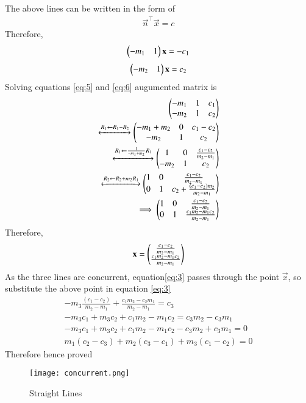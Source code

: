 \documentclass[12pt]{article}
\begin{document}
\begin{enumerate}
    
   The above lines can be written in the form of \begin{align}
        \Vec{n}^{\top}\Vec{x} = c
    \end{align}
   Therefore,
		\begin{align}
       \begin{pmatrix}-m_1&1\end{pmatrix}\mathbf{x}=-c_1
       \label{eq:5}
   \end{align} 
   \begin{align}
       \begin{pmatrix}-m_2&1\end{pmatrix}\mathbf{x}=c_2
       \label{eq:6}
   \end{align}
   Solving equations \eqref{eq:5} and \eqref{eq:6}
		augumented matrix is
 \begin{align}
    \begin{pmatrix}-m_1&1&c_1\\-m_2&1&c_2\end{pmatrix}\\
    \xleftrightarrow{R_1 \leftarrow R_1-R_2}
    \begin{pmatrix}-m_1+m_2&0&c_1-c_2\\-m_2&1&c_2\end{pmatrix}\\
    \xleftrightarrow{R_1 \leftarrow \frac{1}{-m_1+m_2} R_1}
    \begin{pmatrix}1&0&\frac{c_1-c_2}{m_2-m_1}\\-m_2&1&c_2\end{pmatrix}\\
    \xleftrightarrow{R_2 \leftarrow R_2+m_2R_1}
    \begin{pmatrix}1&0&\frac{c_1-c_2}{m_2-m_1}\\0&1&c_2+\frac{(c_1-c_2)m_2}{m_2-m_1}\end{pmatrix}\\
   \implies \begin{pmatrix}1&0&\frac{c_1-c_2}{m_2-m_1}\\0&1&\frac{c_1m_2-m_1c_2}{m_2-m_1}\end{pmatrix}
\end{align}
Therefore, \begin{align}    
\mathbf{x} = \begin{pmatrix}\frac{c_1-c_2}{m_2-m_1}\\\frac{c_1m_2-m_1c_2}{m_2-m_1}\end{pmatrix}
\end{align}
As the three lines are concurrent, equation\eqref{eq:3} passes through the point $\Vec{x}$, so substitute the above point in equation
\eqref{eq:3}
\begin{align}
    -m_3\frac{(c_1-c_2)}{m_2-m_1}+\frac{c_1m_2-c_2m_1}{m_2-m_1} = c_3\\
    -m_3c_1+m_3c_2+c_1m_2-m_1c_2 = c_3m_2-c_3m_1\\
    -m_3c_1+m_3c_2+c_1m_2-m_1c_2-c_3m_2+c_3m_1 = 0\\
    m_1(c_2-c_3)+m_2(c_3-c_1)+m_3(c_1-c_2) = 0
    \end{align}
    Therefore hence proved
\begin{figure}[h]
    \centering
    \texttt{[image: concurrent.png]}
    \caption{Straight Lines}
    \label{fig:concurrent.png}
\end{figure}
\end{enumerate}
\end{document}
